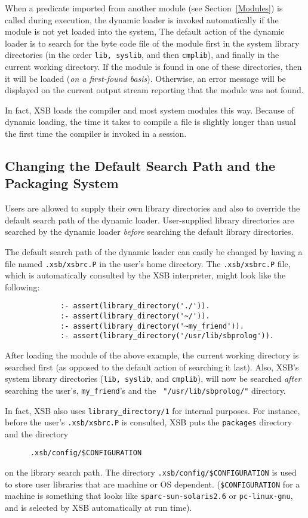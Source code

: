 When a predicate imported from another module (see
Section~\ref{Modules}) is called during execution, the dynamic loader
is invoked automatically if the module is not yet loaded into the
system, The default action of the dynamic loader is to search for the
byte code file of the module first in the system library directories
(in the order {\tt lib, syslib}, and then {\tt cmplib}), and finally
in the current working directory.  If the module is found in one of
these directories, then it will be loaded ({\em on a first-found
basis}). Otherwise, an error message will be displayed on the current
output stream reporting that the module was not found.

In fact, XSB loads the compiler and most system modules this way.
Because of dynamic loading, the time it takes to compile a file 
is slightly longer than usual the first time the compiler is 
invoked in a session.


\subsection{Changing the Default Search Path and the Packaging System}
Users are allowed to supply their own library directories and also to
override the default search path of the dynamic loader. 
User-supplied library directories are searched by the dynamic loader 
{\em before} searching the default library directories. 

The default search path of the dynamic loader can easily be changed
by having a file named {\verb|.xsb/xsbrc.P|} in the user's home directory.  
The {\verb|.xsb/xsbrc.P|} file, which is automatically consulted by the
 XSB interpreter, might look like the following:
\begin{verbatim}
             :- assert(library_directory('./')).
             :- assert(library_directory('~/')).
             :- assert(library_directory('~my_friend')).
             :- assert(library_directory('/usr/lib/sbprolog')).
\end{verbatim}
After loading the module of the above example, the current working
directory is searched first (as opposed to the default action of
searching it last).  Also, XSB's system library directories
({\tt lib, syslib}, and {\tt cmplib}), will now be searched {\em
after} searching the user's, {\tt my\_friend}'s and the {\tt
"/usr/lib/sbprolog/"} directory.

 In fact, XSB also uses {\tt library\_directory/1} for internal purposes.
 For instance, before the user's {\verb|.xsb/xsbrc.P|} is consulted,
 XSB puts the {\tt packages} directory and the directory 
 \begin{verbatim}
      .xsb/config/$CONFIGURATION
 \end{verbatim}
 on the library search path.
 The directory \verb'.xsb/config/$CONFIGURATION' is used to store user
 libraries that are machine or OS dependent. (\verb'$CONFIGURATION' for a
 machine is something that looks like {\tt sparc-sun-solaris2.6} or
 {\tt pc-linux-gnu}, and is selected by XSB automatically at run time).  

